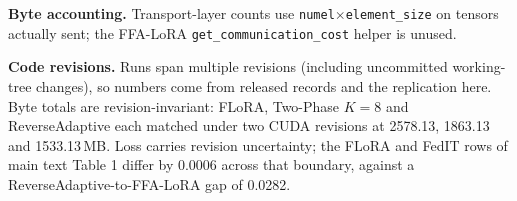 \documentclass[pdflatex,sn-nature]{sn-jnl}
\begin{document}
\textbf{Byte accounting.} Transport-layer counts use \texttt{numel}$\times$\texttt{element\_size} on tensors actually sent; the FFA-LoRA \texttt{get\_communication\_cost} helper is unused.

\textbf{Code revisions.} Runs span multiple revisions (including uncommitted working-tree changes), so numbers come from released records and the replication here. Byte totals are revision-invariant: FLoRA, Two-Phase $K{=}8$ and ReverseAdaptive each matched under two CUDA revisions at 2578.13, 1863.13 and 1533.13\,MB. Loss carries revision uncertainty; the FLoRA and FedIT rows of main text Table 1 differ by 0.0006 across that boundary, against a ReverseAdaptive-to-FFA-LoRA gap of 0.0282.


\end{document}
